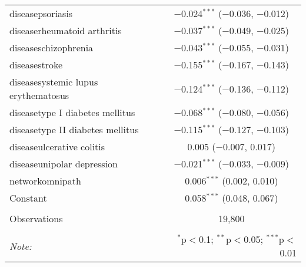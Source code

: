 \begin{table}[!htbp]
\begin{tabular}{@{\extracolsep{5pt}}lc}
  diseasepsoriasis & $-$0.024$^{***}$ ($-$0.036, $-$0.012) \\ 
  diseaserheumatoid arthritis & $-$0.037$^{***}$ ($-$0.049, $-$0.025) \\ 
  diseaseschizophrenia & $-$0.043$^{***}$ ($-$0.055, $-$0.031) \\ 
  diseasestroke & $-$0.155$^{***}$ ($-$0.167, $-$0.143) \\ 
  diseasesystemic lupus erythematosus & $-$0.124$^{***}$ ($-$0.136, $-$0.112) \\ 
  diseasetype I diabetes mellitus & $-$0.068$^{***}$ ($-$0.080, $-$0.056) \\ 
  diseasetype II diabetes mellitus & $-$0.115$^{***}$ ($-$0.127, $-$0.103) \\ 
  diseaseulcerative colitis & 0.005 ($-$0.007, 0.017) \\ 
  diseaseunipolar depression & $-$0.021$^{***}$ ($-$0.033, $-$0.009) \\ 
  networkomnipath & 0.006$^{***}$ (0.002, 0.010) \\ 
  Constant & 0.058$^{***}$ (0.048, 0.067) \\ 
 \hline \\[-1.8ex] 
Observations & 19,800 \\ 
\hline 
\hline \\[-1.8ex] 
\textit{Note:}  & \multicolumn{1}{r}{$^{*}$p$<$0.1; $^{**}$p$<$0.05; $^{***}$p$<$0.01} \\ 
\end{tabular} 
\end{table} 
